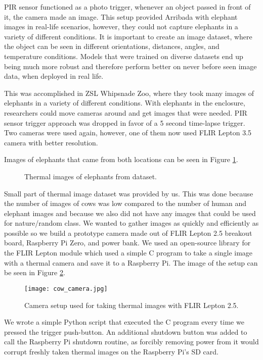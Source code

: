 PIR sensor functioned as a photo trigger, whenever an object passed in front of it, the camera made an image.
This setup provided Arribada with elephant images in real-life scenarios, however, they could not capture elephants in a variety of different conditions. 
It is important to create an image dataset, where the object can be seen in different orientations, distances, angles, and temperature conditions.
Models that were trained on diverse datasets end up being much more robust and therefore perform better on never before seen image data, when deployed in real life.

This was accomplished in ZSL Whipsnade Zoo, where they took many images of elephants in a variety of different conditions\cite{dataset_collection}.
With elephants in the enclosure, researchers could move cameras around and get images that were needed.
PIR sensor trigger approach was dropped in favor of a 5 second time-lapse trigger.
Two cameras were used again, however, one of them now used FLIR Lepton 3.5 camera with better resolution.

Images of elephants that came from both locations can be seen in Figure \ref{four_elephants}.

\begin{figure}[ht]
    \centering
    \caption{Thermal images of elephants from dataset.}
    \label{four_elephants}
\end{figure}


Small part of thermal image dataset was provided by us. This was done because the number of images of cows was low compared to the number of human and elephant images and because we also did not have any images that could be used for nature/random class.
We wanted to gather images as quickly and efficiently as possible so we build a prototype camera made out of FLIR Lepton 2.5 breakout board, Raspberry Pi Zero, and power bank.
We used an open-source library \cite{flir_github} for the FLIR Lepton module which used a simple C program to take a single image with a thermal camera and save it to a Raspberry Pi.
The image of the setup can be seen in Figure \ref{cow_camera}.

\begin{figure}[ht]
    \centering
    \texttt{[image: cow\_camera.jpg]} 
    \caption{Camera setup used for taking thermal images with FLIR Lepton 2.5.}
    \label{cow_camera}
\end{figure}

We wrote a simple Python script that executed the C program every time we pressed the trigger push-button.
An additional shutdown button was added to call the Raspberry Pi shutdown routine, as forcibly removing power from it would corrupt freshly taken thermal images on the Raspberry Pi's SD card.

